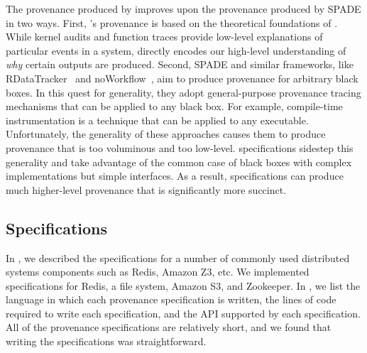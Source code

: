 The provenance produced by \fluent{} improves upon the provenance produced by
SPADE in two ways. First, \fluent{}'s provenance is based on the theoretical
foundations of \watprovenance{}. While kernel audits and function traces
provide low-level explanations of particular events in a system,
\watprovenance{} directly encodes our high-level understanding of \emph{why}
certain outputs are produced. Second, SPADE and similar frameworks, like
RDataTracker~\cite{lerner2014collecting} and
noWorkflow~\cite{murta2014noworkflow}, aim to produce provenance for arbitrary
black boxes. In this quest for generality, they adopt general-purpose
provenance tracing mechanisms that can be applied to any black box. For
example, compile-time instrumentation is a technique that can be applied to any
executable.  Unfortunately, the generality of these approaches causes them to
produce provenance that is too voluminous and too low-level. \Watprovenance{}
specifications sidestep this generality and take advantage of the common case
of black boxes with complex implementations but simple interfaces.
As a result,
\watprovenance{} specifications can produce much higher-level provenance that
is significantly more succinct.

{}

\subsection{\WatProvenance{} Specifications}
In , we described the \watprovenance{} specifications for
a number of commonly used distributed systems components such as Redis, Amazon
Z3, etc. We implemented \fluent{} \watprovenance{} specifications for Redis, a
file system, Amazon S3, and Zookeeper. In , we list the
language in which each provenance specification is written, the lines of code
required to write each specification, and the API supported by each
specification. All of the provenance specifications are relatively short, and
we found that writing the specifications was straightforward.

